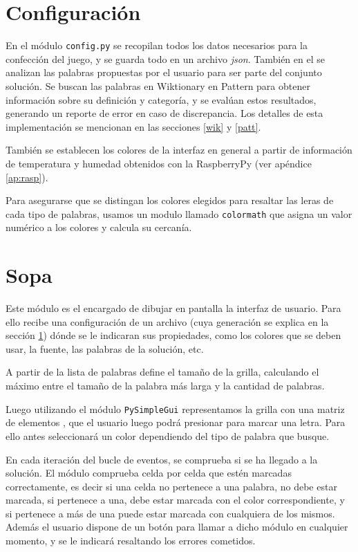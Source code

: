 \section{Configuración}\label{config}
En el módulo \texttt{config.py} se recopilan todos los datos necesarios para la confección del juego, y se guarda todo en un archivo \emph{json}. También en el se analizan las palabras propuestas por el usuario para ser parte del conjunto solución. Se buscan las palabras en Wiktionary en Pattern para obtener información sobre su definición y categoría, y se evalúan estos resultados, generando un reporte de error en caso de discrepancia. Los detalles de esta implementación se mencionan en las secciones \ref{wik} y \ref{patt}.

También se establecen los colores de la interfaz en general a partir de información de temperatura y humedad obtenidos con la RaspberryPy (ver apéndice \ref{ap:rasp}).

Para asegurarse que se distingan los colores elegidos para resaltar las leras de cada tipo de palabras, usamos un modulo llamado \texttt{colormath} que asigna un valor numérico a los colores y calcula su cercanía.

\section{Sopa}\label{sopa}
Este módulo es el encargado de dibujar en pantalla la interfaz de usuario. Para ello recibe una configuración de un archivo (cuya generación se explica en la sección \ref{config}) dónde se le indicaran sus propiedades, como los colores que se deben usar, la fuente, las palabras de la solución, etc.

A partir de la lista de palabras define el tamaño de la grilla, calculando el máximo entre el tamaño de la palabra más larga y la cantidad de palabras.

Luego utilizando el módulo \texttt{PySimpleGui} representamos la grilla con una matriz de elementos , que el usuario luego podrá presionar para marcar una letra. Para ello antes seleccionará un color dependiendo del tipo de palabra que busque.

En cada iteración del bucle de eventos, se comprueba si se ha llegado a la solución. El módulo  comprueba celda por celda que estén marcadas correctamente, es decir si una celda no pertenece a una palabra, no debe estar marcada, si pertenece a una, debe estar marcada con el color correspondiente, y si pertenece a más de una puede estar marcada con cualquiera de los mismos. Además el usuario dispone de un botón para llamar a dicho módulo en cualquier momento, y se le indicará resaltando los errores cometidos.


